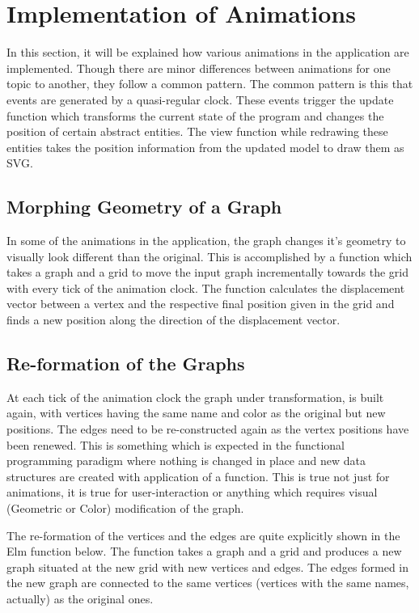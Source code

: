 \section{Implementation of Animations}
In this section, it will be explained how various animations in the
application are implemented. Though there are minor differences between animations
for one topic to another, they follow a common pattern. The common pattern is
this that events are generated by a quasi-regular clock. These events trigger
the update function which transforms the current state of the program and
changes the position of certain abstract entities. The view function while
redrawing these entities takes the position information from the updated model
to draw them as SVG.

\subsection{Morphing Geometry of a Graph}
In some of the animations in the application, the graph changes it's geometry
to visually look different than the original. This is accomplished by a
function which takes a graph and a grid to move the input graph incrementally
towards the grid with every tick of the animation clock. The function
calculates the displacement vector between a vertex and the respective final
position given in the grid and finds a new position along the direction of the
displacement vector.

\subsection{Re-formation of the Graphs}
At each tick of the animation clock the graph under transformation, is built
again, with vertices having the same name and color as the original but new
positions. The edges need to be re-constructed again as the vertex positions
have been renewed. This is something which is expected in the functional
programming paradigm where nothing is changed in place and new data structures
are created with application of a function. This is true not just for
animations, it is true for user-interaction or anything which requires visual
(Geometric or Color) modification of the graph.

The re-formation of the vertices and the edges are quite explicitly shown in
the Elm function below. The function takes a graph and a grid and produces a
new graph situated at the new grid with new vertices and edges.  The edges
formed in the new graph are connected to the same vertices (vertices with the
same names, actually) as the original ones.

